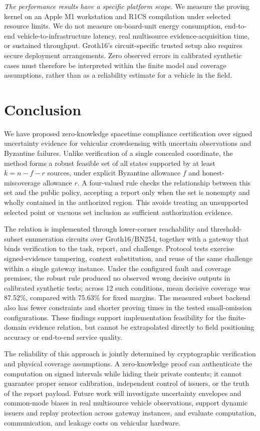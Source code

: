 \emph{The performance results have a specific platform scope.} We measure the proving kernel on an Apple M1 workstation and R1CS compilation under selected resource limits. We do not measure on-board-unit energy consumption, end-to-end vehicle-to-infrastructure latency, real multisource evidence-acquisition time, or sustained throughput. Groth16's circuit-specific trusted setup also requires secure deployment arrangements. Zero observed errors in calibrated synthetic cases must therefore be interpreted within the finite model and coverage assumptions, rather than as a reliability estimate for a vehicle in the field.

\section{Conclusion}
We have proposed zero-knowledge spacetime compliance certification over signed uncertainty evidence for vehicular crowdsensing with uncertain observations and Byzantine failures. Unlike verification of a single concealed coordinate, the method forms a robust feasible set of all states supported by at least $k=n-f-r$ sources, under explicit Byzantine allowance $f$ and honest-miscoverage allowance $r$. A four-valued rule checks the relationship between this set and the public policy, accepting a report only when the set is nonempty and wholly contained in the authorized region. This avoids treating an unsupported selected point or vacuous set inclusion as sufficient authorization evidence.

The relation is implemented through lower-corner reachability and threshold-subset enumeration circuits over Groth16/BN254, together with a gateway that binds verification to the task, report, and challenge. Protocol tests exercise signed-evidence tampering, context substitution, and reuse of the same challenge within a single gateway instance. Under the configured fault and coverage premises, the robust rule produced no observed wrong decisive outputs in calibrated synthetic tests; across 12 such conditions, mean decisive coverage was 87.52\%, compared with 75.63\% for fixed margins. The measured subset backend also has fewer constraints and shorter proving times in the tested small-omission configurations. These findings support implementation feasibility for the finite-domain evidence relation, but cannot be extrapolated directly to field positioning accuracy or end-to-end service quality.

The reliability of this approach is jointly determined by cryptographic verification and physical coverage assumptions. A zero-knowledge proof can authenticate the computation on signed intervals while hiding their private contents; it cannot guarantee proper sensor calibration, independent control of issuers, or the truth of the report payload. Future work will investigate uncertainty envelopes and common-mode biases in real multisource vehicle observations, support dynamic issuers and replay protection across gateway instances, and evaluate computation, communication, and leakage costs on vehicular hardware.

